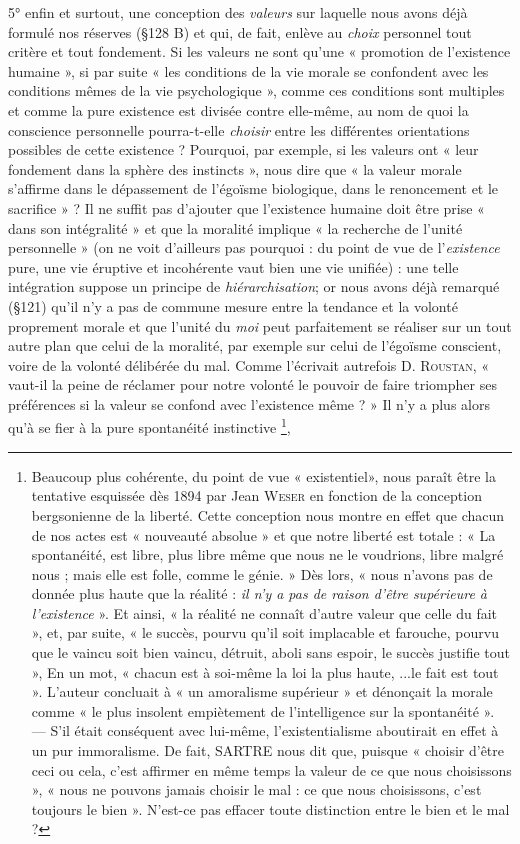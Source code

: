 5° enfin et surtout, une conception des {\it valeurs} sur laquelle nous
avons déjà formulé nos réserves (\S 128 B) et qui, de fait, enlève au
{\it choix} personnel tout critère et tout fondement. Si les valeurs ne sont
qu’une « promotion de l’existence humaine », si par suite « les conditions
de la vie morale se confondent avec les conditions mêmes de la
vie psychologique », comme ces conditions sont multiples et comme la
pure existence est divisée contre elle-même, au nom de quoi la conscience
personnelle pourra-t-elle {\it choisir} entre les différentes orientations
possibles de cette existence ? Pourquoi, par exemple, si les valeurs
ont « leur fondement dans la sphère des instincts », nous dire que « la
valeur morale s'affirme dans le dépassement de l’égoïsme biologique,
dans le renoncement et le sacrifice » ? Il ne suffit pas d’ajouter que
l'existence humaine doit être prise « dans son intégralité » et que la
moralité implique « la recherche de l’unité personnelle » (on ne voit
d’ailleurs pas pourquoi : du point de vue de l'{\it existence} pure, une vie
éruptive et incohérente vaut bien une vie unifiée) : une telle intégration
suppose un principe de {\it hiérarchisation}; or nous avons déjà
remarqué (\S 121) qu’il n’y a pas de commune mesure entre la tendance
et la volonté proprement morale et que l’unité du {\it moi} peut parfaitement
se réaliser sur un tout autre plan que celui de la moralité, par
exemple sur celui de l’égoïsme conscient, voire de la volonté délibérée
du mal. Comme l’écrivait autrefois D. \textsc{Roustan}, « vaut-il la peine de
réclamer pour notre volonté le pouvoir de faire triompher ses préférences
si la valeur se confond avec l’existence même ? » Il n’y a plus
alors qu’à se fier à la pure spontanéité instinctive \footnote{Beaucoup plus cohérente, du point de vue « existentiel», nous paraît être la tentative
esquissée dès 1894 par Jean \textsc{Weser} en fonction de la conception bergsonienne de
la liberté. Cette conception nous montre en effet que chacun de nos actes est « nouveauté
absolue » et que notre liberté est totale : « La spontanéité, est libre, plus libre même
que nous ne le voudrions, libre malgré nous ; mais elle est folle, comme le génie. » Dès
lors, « nous n'avons pas de donnée plus haute que la réalité : {\it il n'y a pas de raison
d'être supérieure à l'existence} ». Et ainsi, « la réalité ne connaît d'autre valeur que celle
du fait », et, par suite, « le succès, pourvu qu'il soit implacable et farouche, pourvu que
le vaincu soit bien vaincu, détruit, aboli sans espoir, le succès justifie tout », En un mot,
« chacun est à soi-même la loi la plus haute, ...le fait est tout ». L'auteur concluait à « un
amoralisme supérieur » et dénonçait la morale comme « le plus insolent empiètement de
l'intelligence sur la spontanéité ». — S'il était conséquent avec lui-même, l'existentialisme
aboutirait en effet à un pur immoralisme. De fait, SARTRE nous dit que, puisque
« choisir d’être ceci ou cela, c'est affirmer en même temps la valeur de ce que nous
choisissons », « nous ne pouvons jamais choisir le mal : ce que nous choisissons, c'est
toujours le bien ». N'est-ce pas effacer toute distinction entre le bien et le mal ?},
